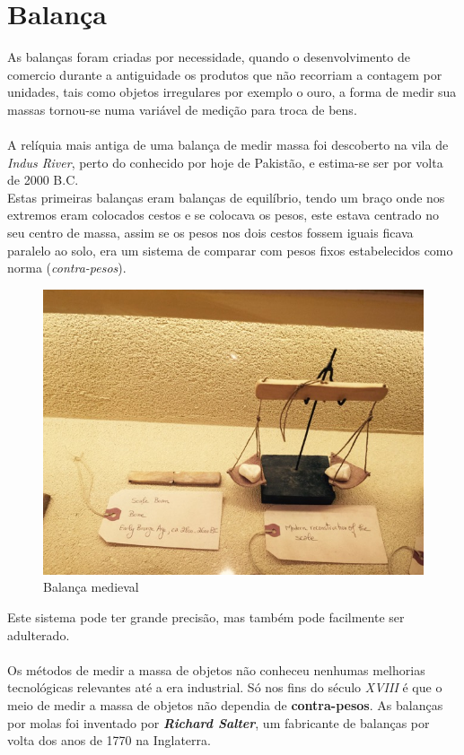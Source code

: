 \chapter{Balança}
As balanças foram criadas por necessidade, quando o desenvolvimento de comercio durante a antiguidade os produtos que não recorriam a contagem por unidades, tais como objetos irregulares por exemplo o ouro, a forma de medir sua massas tornou-se numa variável de medição para troca de bens.\\
\\
A relíquia mais antiga de uma balança de medir massa foi descoberto na vila de \textit{Indus River}, perto do conhecido por hoje de Pakistão, e estima-se ser por volta de 2000 B.C.\\
Estas primeiras balanças eram balanças de equilíbrio, tendo um braço onde nos extremos eram colocados cestos e se colocava os pesos, este estava centrado no seu centro de massa, assim se os pesos nos dois cestos fossem iguais ficava paralelo ao solo, era um sistema de comparar com pesos fixos estabelecidos como norma (\textit{contra-pesos}).
\\
\begin{figure}[H]
	\centering
	\includegraphics[scale=0.52]{./image/PESTA/general/balanca_1.jpg}
	\caption{Balança medieval}
	\label{Balanca_1}
\end{figure}
Este sistema pode ter grande precisão, mas também pode facilmente ser adulterado.
\\
\\
Os métodos de medir a massa de objetos não conheceu nenhumas melhorias tecnológicas relevantes até a era industrial. Só nos fins do século \textit{XVIII} é que o meio de medir a massa de objetos não dependia de \textbf{contra-pesos}. As balanças por molas foi inventado por \textbf{\textit{Richard Salter}}, um fabricante de balanças por volta dos anos de 1770 na Inglaterra.\\
